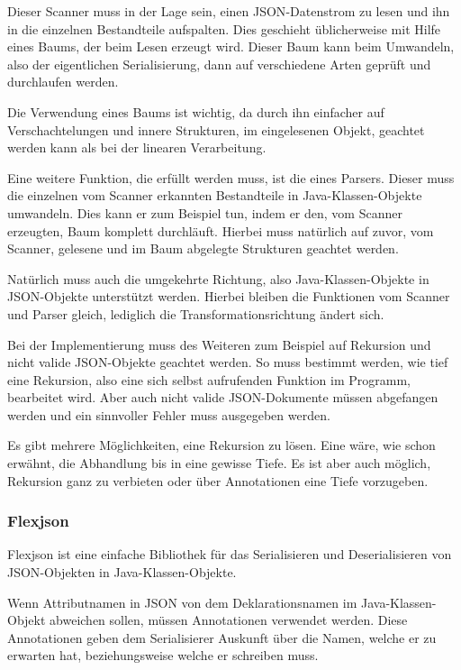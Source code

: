 Dieser Scanner muss in der Lage sein, einen \ac{JSON}-Datenstrom zu lesen und ihn in die einzelnen Bestandteile aufspalten. Dies geschieht \"ublicherweise mit Hilfe eines Baums, der beim Lesen erzeugt wird. Dieser Baum kann beim Umwandeln, also der eigentlichen Serialisierung, dann auf verschiedene Arten gepr\"uft und durchlaufen werden.

Die Verwendung eines Baums ist wichtig, da durch ihn einfacher auf Verschachtelungen und innere Strukturen, im eingelesenen Objekt, geachtet werden kann als bei der linearen Verarbeitung. \cite{JahnBaum}

Eine weitere Funktion, die erf\"ullt werden muss, ist die eines Parsers. Dieser muss die einzelnen vom Scanner erkannten Bestandteile in Java-Klassen-Objekte umwandeln. Dies kann er zum Beispiel tun, indem er den, vom Scanner erzeugten, Baum komplett durchl\"auft. Hierbei muss nat\"urlich auf zuvor, vom Scanner, gelesene und im Baum abgelegte Strukturen geachtet werden.

Nat\"urlich muss auch die umgekehrte Richtung, also Java-Klassen-Objekte in \ac{JSON}-Objekte unterst\"utzt werden. Hierbei bleiben die Funktionen vom Scanner und Parser gleich, lediglich die Transformationsrichtung \"andert sich.

Bei der Implementierung muss des Weiteren zum Beispiel auf Rekursion und nicht valide \ac{JSON}-Objekte geachtet werden. So muss bestimmt werden, wie tief eine Rekursion, also eine sich selbst aufrufenden Funktion im Programm, bearbeitet wird. Aber auch nicht valide JSON-Dokumente m\"ussen abgefangen werden und ein sinnvoller Fehler muss ausgegeben werden.

Es gibt mehrere M\"oglichkeiten, eine Rekursion zu l\"osen. Eine w\"are, wie schon erw\"ahnt, die Abhandlung bis in eine gewisse Tiefe. Es ist aber auch m\"oglich, Rekursion ganz zu verbieten oder \"uber Annotationen eine Tiefe vorzugeben.

\subsubsection{Flexjson}
Flexjson ist eine einfache Bibliothek f\"ur das Serialisieren und Deserialisieren von \ac{JSON}-Objekten in Java-Klassen-Objekte.\cite{FlexJSON}

Wenn Attributnamen in \ac{JSON} von dem Deklarationsnamen im Java-Klassen-Objekt abweichen sollen, m\"ussen Annotationen verwendet werden. Diese Annotationen geben dem Serialisierer Auskunft \"uber die Namen, welche er zu erwarten hat, beziehungsweise welche er schreiben muss.

